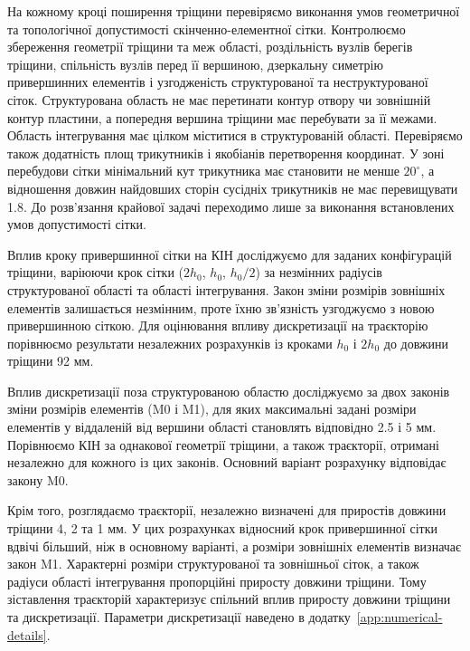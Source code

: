 \documentclass[a4paper,12pt]{article}
\begin{document}
На кожному кроці поширення тріщини перевіряємо виконання умов геометричної та топологічної
допустимості скінченно-елементної сітки. Контролюємо збереження геометрії тріщини та меж області,
роздільність вузлів берегів тріщини, спільність вузлів перед її вершиною, дзеркальну симетрію
привершинних елементів і узгодженість структурованої та неструктурованої сіток.
Структурована область не має перетинати контур отвору чи зовнішній контур пластини,
а попередня вершина тріщини має перебувати за її межами. Область інтегрування має цілком
міститися в структурованій області. Перевіряємо також додатність площ трикутників
і якобіанів перетворення координат. У зоні перебудови сітки мінімальний кут трикутника
має становити не менше $20^\circ$, а відношення довжин найдовших сторін сусідніх
трикутників не має перевищувати 1.8. До розв’язання крайової задачі переходимо лише
за виконання встановлених умов допустимості сітки.

Вплив кроку привершинної сітки на КІН досліджуємо для заданих конфігурацій тріщини,
варіюючи крок сітки ($2h_0$, $h_0$, $h_0/2$) за незмінних радіусів структурованої області
та області інтегрування. Закон зміни розмірів зовнішніх елементів залишається незмінним,
проте їхню зв’язність узгоджуємо з новою привершинною сіткою. Для оцінювання впливу
дискретизації на траєкторію порівнюємо результати незалежних розрахунків із кроками $h_0$
і $2h_0$ до довжини тріщини 92 мм.

Вплив дискретизації поза структурованою областю досліджуємо за двох законів зміни розмірів
елементів (M0 і M1), для яких максимальні задані розміри елементів у віддаленій від вершини
області становлять відповідно 2.5 і 5 мм. Порівнюємо КІН за однакової геометрії тріщини,
а також траєкторії, отримані незалежно для кожного із цих законів. Основний варіант
розрахунку відповідає закону M0.

Крім того, розглядаємо траєкторії, незалежно визначені для приростів довжини тріщини 4, 2 та 1 мм.
У цих розрахунках відносний крок привершинної сітки вдвічі більший, ніж в основному
варіанті, а розміри зовнішніх елементів визначає закон M1. Характерні розміри структурованої
та зовнішньої сіток, а також радіуси області інтегрування пропорційні приросту довжини тріщини.
Тому зіставлення траєкторій характеризує спільний вплив приросту довжини тріщини
та дискретизації. Параметри дискретизації наведено в додатку~\ref{app:numerical-details}.
\end{document}
